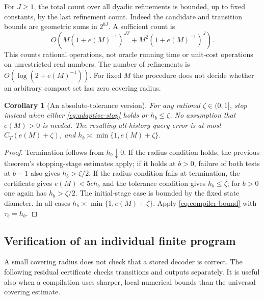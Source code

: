 \documentclass[11pt]{amsart}
\newtheorem{corollary}[theorem]{Corollary}
\theoremstyle{definition}\newtheorem{definition}[theorem]{Definition}
\theoremstyle{remark}\newtheorem{remark}[theorem]{Remark}
\begin{document}
For $J\ge1$, the total count over all dyadic refinements is bounded,
up to fixed constants, by the last refinement count. Indeed the candidate
and transition bounds are geometric sums in $2^{bJ}$. A sufficient count
is
\[
 O\!\left(M(1+e(M)^{-1})^{JT}
                  +M^2(1+e(M)^{-1})^J\right).
\]
This counts rational operations, not oracle running time or unit-cost
operations on unrestricted real numbers. The number of refinements is
$O(\log(2+e(M)^{-1}))$. For fixed $M$ the procedure does not decide
whether an arbitrary compact set has zero covering radius.

\begin{corollary}[An absolute-tolerance version]
\label{cor:absolute-tolerance}
For any rational $\zeta\in(0,1]$, stop instead when either
\eqref{eq:adaptive-stop} holds or $h_b\le\zeta$. No assumption that
$e(M)>0$ is needed. The resulting all-history query error is at most
$C_T(e(M)+\zeta)$, and $h_b\asymp\min\{1,e(M)+\zeta\}$.
\end{corollary}
\begin{proof}
Termination follows from $h_b\downarrow0$. If the radius condition
holds, the previous theorem's stopping-stage estimates apply; if it
holds at $b>0$, failure of both tests at $b-1$ also gives
$h_b>\zeta/2$. If the radius condition fails at termination, the
certificate gives $e(M)<5ch_b$ and the tolerance condition gives
$h_b\le\zeta$; for $b>0$ one again has $h_b>\zeta/2$.
The initial-stage case is bounded by the fixed state diameter. In all
cases $h_b\asymp\min\{1,e(M)+\zeta\}$. Apply
\eqref{eq:compiler-bound} with $\tau_b=h_b$.
\end{proof}

\subsection{Verification of an individual finite program}
A small covering radius does not check that a stored decoder is correct.
The following residual certificate checks transitions and outputs
separately. It is useful also when a compilation uses sharper, local
numerical bounds than the universal covering estimate.
\end{document}
